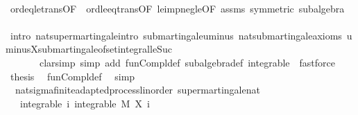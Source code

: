 \begin{isabellebody}
\ \ \ \ \isamarkupfalse%
\ ord{\isacharunderscore}{\kern0pt}eq{\isacharunderscore}{\kern0pt}le{\isacharunderscore}{\kern0pt}trans{\isacharbrackleft}{\kern0pt}OF\ {\isacharasterisk}{\kern0pt}\ ord{\isacharunderscore}{\kern0pt}le{\isacharunderscore}{\kern0pt}eq{\isacharunderscore}{\kern0pt}trans{\isacharbrackleft}{\kern0pt}OF\ le{\isacharunderscore}{\kern0pt}imp{\isacharunderscore}{\kern0pt}neg{\isacharunderscore}{\kern0pt}le{\isacharbrackleft}{\kern0pt}OF\ assms{\isacharparenleft}{\kern0pt}{}{\isacharparenright}{\kern0pt}{\isacharbrackright}{\kern0pt}\ {\isacharasterisk}{\kern0pt}{\isacharbrackleft}{\kern0pt}symmetric{\isacharbrackright}{\kern0pt}{\isacharbrackright}{\kern0pt}{\isacharbrackright}{\kern0pt}\ subalgebra\isanewline
\ \ \ \ \isamarkupfalse%
\ {\isacharparenleft}{\kern0pt}intro\ nat{\isacharunderscore}{\kern0pt}supermartingale{\isachardot}{\kern0pt}intro\ submartingale{\isachardot}{\kern0pt}uminus\ nat{\isacharunderscore}{\kern0pt}submartingale{\isachardot}{\kern0pt}axioms\ uminus{\isacharunderscore}{\kern0pt}X{\isachardot}{\kern0pt}submartingale{\isacharunderscore}{\kern0pt}of{\isacharunderscore}{\kern0pt}set{\isacharunderscore}{\kern0pt}integral{\isacharunderscore}{\kern0pt}le{\isacharunderscore}{\kern0pt}Suc{\isacharparenright}{\kern0pt}\ \isanewline
\ \ \ \ \ \ \ {\isacharparenleft}{\kern0pt}clarsimp\ simp\ add{\isacharcolon}{\kern0pt}\ fun{\isacharunderscore}{\kern0pt}Compl{\isacharunderscore}{\kern0pt}def\ subalgebra{\isacharunderscore}{\kern0pt}def\ integrable\ {\isacharbar}{\kern0pt}\ fastforce{\isacharparenright}{\kern0pt}{\isacharplus}{\kern0pt}\isanewline
\ \ \isamarkupfalse%
\ {\isacharquery}{\kern0pt}thesis\ \isamarkupfalse%
\ fun{\isacharunderscore}{\kern0pt}Compl{\isacharunderscore}{\kern0pt}def\ \isamarkupfalse%
\ simp\isanewline
{}\isamarkupfalse%
%
\endisatagproof
{\isafoldproof}%
%
\isadelimproof
\isanewline
%
\endisadelimproof
\isanewline
{}\isamarkupfalse%
\ {\isacharparenleft}{\kern0pt}\ nat{\isacharunderscore}{\kern0pt}sigma{\isacharunderscore}{\kern0pt}finite{\isacharunderscore}{\kern0pt}adapted{\isacharunderscore}{\kern0pt}process{\isacharunderscore}{\kern0pt}linorder{\isacharparenright}{\kern0pt}\ supermartingale{\isacharunderscore}{\kern0pt}nat{\isacharcolon}{\kern0pt}\isanewline
\ \ \ integrable{\isacharcolon}{\kern0pt}\ {\isachardoublequoteopen}{\isasymAnd}i{\isachardot}{\kern0pt}\ integrable\ M\ {\isacharparenleft}{\kern0pt}X\ i{\isacharparenright}{\kern0pt}{\isachardoublequoteclose}\ \isanewline

\end{isabellebody}
